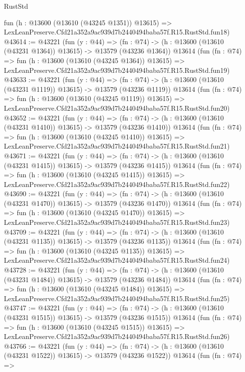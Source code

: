 \begin{lexlean}{RustStd}
\begin{coremodule}
    fun (h : @13600 (@13610 (@43245 @1351)) @13615) =>
    LexLeanPreserve.Cfd21a352a9ac939d7b2440494baba57f.R15.RustStd.fun18)
@43614 := @43221
    (fun (y : @44) =>
    (fn : @74) -> (h : @13600 (@13610 (@43231 @1364)) @13615) -> @13579 (@43236 @1364))
    @13614
    (fun (fn : @74) =>
    fun (h : @13600 (@13610 (@43245 @1364)) @13615) =>
    LexLeanPreserve.Cfd21a352a9ac939d7b2440494baba57f.R15.RustStd.fun19)
@43633 := @43221
    (fun (y : @44) =>
    (fn : @74) -> (h : @13600 (@13610 (@43231 @1119)) @13615) -> @13579 (@43236 @1119))
    @13614
    (fun (fn : @74) =>
    fun (h : @13600 (@13610 (@43245 @1119)) @13615) =>
    LexLeanPreserve.Cfd21a352a9ac939d7b2440494baba57f.R15.RustStd.fun20)
@43652 := @43221
    (fun (y : @44) =>
    (fn : @74) -> (h : @13600 (@13610 (@43231 @1410)) @13615) -> @13579 (@43236 @1410))
    @13614
    (fun (fn : @74) =>
    fun (h : @13600 (@13610 (@43245 @1410)) @13615) =>
    LexLeanPreserve.Cfd21a352a9ac939d7b2440494baba57f.R15.RustStd.fun21)
@43671 := @43221
    (fun (y : @44) =>
    (fn : @74) -> (h : @13600 (@13610 (@43231 @1415)) @13615) -> @13579 (@43236 @1415))
    @13614
    (fun (fn : @74) =>
    fun (h : @13600 (@13610 (@43245 @1415)) @13615) =>
    LexLeanPreserve.Cfd21a352a9ac939d7b2440494baba57f.R15.RustStd.fun22)
@43690 := @43221
    (fun (y : @44) =>
    (fn : @74) -> (h : @13600 (@13610 (@43231 @1470)) @13615) -> @13579 (@43236 @1470))
    @13614
    (fun (fn : @74) =>
    fun (h : @13600 (@13610 (@43245 @1470)) @13615) =>
    LexLeanPreserve.Cfd21a352a9ac939d7b2440494baba57f.R15.RustStd.fun23)
@43709 := @43221
    (fun (y : @44) =>
    (fn : @74) -> (h : @13600 (@13610 (@43231 @1135)) @13615) -> @13579 (@43236 @1135))
    @13614
    (fun (fn : @74) =>
    fun (h : @13600 (@13610 (@43245 @1135)) @13615) =>
    LexLeanPreserve.Cfd21a352a9ac939d7b2440494baba57f.R15.RustStd.fun24)
@43728 := @43221
    (fun (y : @44) =>
    (fn : @74) -> (h : @13600 (@13610 (@43231 @1484)) @13615) -> @13579 (@43236 @1484))
    @13614
    (fun (fn : @74) =>
    fun (h : @13600 (@13610 (@43245 @1484)) @13615) =>
    LexLeanPreserve.Cfd21a352a9ac939d7b2440494baba57f.R15.RustStd.fun25)
@43747 := @43221
    (fun (y : @44) =>
    (fn : @74) -> (h : @13600 (@13610 (@43231 @1515)) @13615) -> @13579 (@43236 @1515))
    @13614
    (fun (fn : @74) =>
    fun (h : @13600 (@13610 (@43245 @1515)) @13615) =>
    LexLeanPreserve.Cfd21a352a9ac939d7b2440494baba57f.R15.RustStd.fun26)
@43766 := @43221
    (fun (y : @44) =>
    (fn : @74) -> (h : @13600 (@13610 (@43231 @1522)) @13615) -> @13579 (@43236 @1522))
    @13614
    (fun (fn : @74) =>

\end{coremodule}
\end{lexlean}
